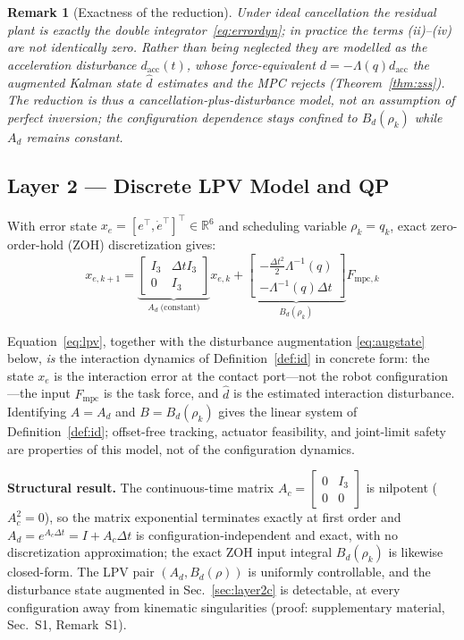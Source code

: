 \documentclass[journal]{IEEEtran}
\newtheorem{remark}{Remark}
\newcommand{\Laminv}{\Lambda^{-1}(q)}
\newcommand{\Fmpc}{F_{\text{mpc}}}
\newcommand{\Fmpck}[1]{F_{\text{mpc},#1}}
\newcommand{\dhat}{\hat{d}}
\begin{document}
\begin{remark}[Exactness of the reduction]
Under \emph{ideal} cancellation the residual plant is exactly the double
integrator~\eqref{eq:errordyn}; in practice the terms
(ii)--(iv) are not identically zero. Rather than being neglected they are
\emph{modelled} as the acceleration disturbance $d_{\text{acc}}(t)$, whose
force-equivalent $d=-\Lambda(q)d_{\text{acc}}$ the augmented Kalman state
$\dhat$ estimates and the MPC rejects (Theorem~\ref{thm:zss}). The reduction is
thus a \emph{cancellation-plus-disturbance} model, not an assumption of perfect
inversion; the configuration dependence stays confined to $B_d(\rho_k)$ while
$A_d$ remains constant.
\end{remark}

\subsection{Layer 2 --- Discrete LPV Model and QP}\label{sec:layer2}

With error state $x_e=[e^\top,\dot{e}^\top]^\top\in\mathbb{R}^6$ and
scheduling variable $\rho_k=q_k$, exact zero-order-hold (ZOH) discretization gives:
\begin{equation}\label{eq:lpv}
  x_{e,k+1} = \underbrace{\begin{bmatrix}I_3&\Delta t I_3\\0&I_3\end{bmatrix}}_{A_d\;\text{(constant)}}
              x_{e,k}
            + \underbrace{\begin{bmatrix}-\tfrac{\Delta t^2}{2}\Laminv\\-\Laminv\Delta t\end{bmatrix}}_{B_d(\rho_k)}
              \Fmpck{k}
\end{equation}

Equation~\eqref{eq:lpv}, together with the disturbance augmentation
\eqref{eq:augstate} below, \emph{is} the interaction dynamics of
Definition~\ref{def:id} in concrete form: the state $x_e$ is the interaction
error at the contact port---not the robot configuration---the input $\Fmpc$ is
the task force, and $\hat d$ is the estimated interaction disturbance.
Identifying $A=A_d$ and $B=B_d(\rho_k)$ gives the linear system 
of Definition~\ref{def:id}; offset-free tracking,
actuator feasibility, and joint-limit safety are properties of this model, not
of the configuration dynamics.

\textbf{Structural result.}
The continuous-time matrix $A_c=\begin{bmatrix}0&I_3\\0&0\end{bmatrix}$
is nilpotent ($A_c^2=0$), so the matrix exponential terminates exactly at
first order and $A_d=e^{A_c\Delta t}=I+A_c\Delta t$ is
configuration-independent and exact, with no discretization
approximation; the exact ZOH input integral $B_d(\rho_k)$ is likewise
closed-form. The LPV pair $(A_d,B_d(\rho))$ is uniformly controllable,
and the disturbance state augmented in Sec.~\ref{sec:layer2c} is
detectable, at every configuration away from kinematic singularities
(proof: supplementary material, Sec.~S1, Remark~S1).
\end{document}

